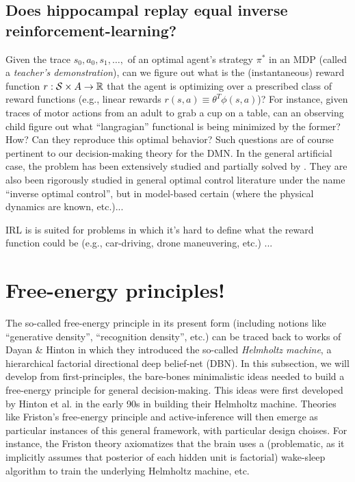 \documentclass[10pt,letterpaper]{article}
\begin{document}
\subsection{Does hippocampal replay equal inverse reinforcement-learning?}
  Given the trace $s_0,a_0,s_1,\ldots,$ of an optimal agent's strategy $\pi^*$ in
  an MDP (called a \textit{teacher's demonstration}), can we figure out what is the
  (instantaneous) reward function $r: \mathcal S \times \mathcal \mathcal A
  \rightarrow \mathbb R$ that the agent is optimizing over a prescribed class of reward functions
  (e.g., linear rewards $r(s,a) \equiv \theta^T\phi(s,a)$)?
  For instance, given traces of motor actions from an adult to grab a cup on a table,
  can an observing child figure out what ``langragian'' functional is being minimized by the former?
  How? Can they reproduce this optimal behavior?
Such questions are of course pertinent to our decision-making theory for the DMN.
In the general artificial case, the problem has been extensively studied and partially solved by
\citep{abbeel2004}. They are also been rigorously studied in general optimal control literature under the name
``inverse optimal control'', but in model-based certain (where the physical dynamics are known, etc.)...

IRL is is suited for problems in which it's hard to define what the reward function could be
(e.g.,  car-driving, drone maneuvering, etc.) ...

\section{Free-energy principles!}
The so-called free-energy principle in its present form (including notions like ``generative density'', ``recognition density'', etc.) can be traced back to works of Dayan \& Hinton \citep{dayan1995helmholtz} in which they introduced the so-called \textit{Helmholtz machine}, a hierarchical factorial directional deep belief-net (DBN).
In this subsection, we will develop from first-principles, the bare-bones minimalistic ideas needed to build a free-energy principle for general decision-making. This ideas were first developed by Hinton et al. in the early 90s in building their Helmholtz machine. Theories like Friston's free-energy principle and active-inference will then emerge as particular instances of this general framework, with particular design choises. For instance, the Friston theory axiomatizes that the brain uses a (problematic, as it implicitly assumes that posterior of each hidden unit is factorial) wake-sleep algorithm to train the underlying Helmholtz machine, etc.
\end{document}
